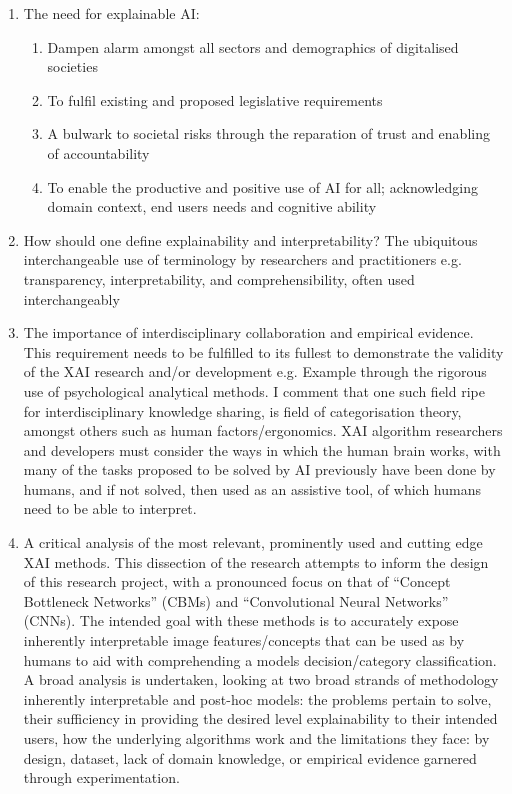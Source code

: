 \begin{enumerate}
    \item The need for explainable AI: 
        \begin{enumerate}
        \item Dampen alarm amongst all sectors and demographics of digitalised societies
        \item To fulfil existing and proposed legislative requirements
        \item A bulwark to societal risks through the reparation of trust and enabling of accountability
        \item To enable the productive and positive use of AI for all; acknowledging domain context, end users needs and cognitive ability
        \end{enumerate}
    \item How should one define explainability and interpretability? The ubiquitous interchangeable use of terminology by researchers and practitioners e.g. transparency, interpretability, and comprehensibility, often used interchangeably 
    \item The importance of interdisciplinary collaboration and empirical evidence. This requirement needs to be fulfilled to its fullest to demonstrate the validity of the XAI research and/or development e.g. Example through the rigorous use of psychological analytical methods. I comment that one such field ripe for interdisciplinary knowledge sharing, is field of categorisation theory, amongst others such as human factors/ergonomics. XAI algorithm researchers and developers must consider the ways in which the human brain works, with many of the tasks proposed to be solved by AI previously have been done by humans, and if not solved, then used as an assistive tool, of which humans need to be able to interpret.
    \item A critical analysis of the most relevant, prominently used and cutting edge XAI methods. This dissection of the research attempts to inform the design of this research project, with a pronounced focus on that of “Concept Bottleneck Networks” (CBMs) and “Convolutional Neural Networks” (CNNs). The intended goal with these methods is to accurately expose inherently interpretable image features/concepts that can be used as by humans to aid with comprehending a models decision/category classification. A broad analysis is undertaken, looking at two broad strands of methodology inherently interpretable and post-hoc models: the problems pertain to solve, their sufficiency in providing the desired level explainability to their intended users, how the underlying algorithms work and the limitations they face: by design, dataset, lack of domain knowledge, or empirical evidence garnered through experimentation.
\end{enumerate}

